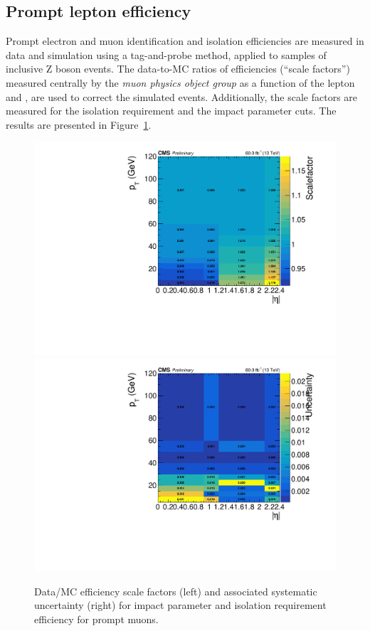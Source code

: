 \subsection{Prompt lepton efficiency} \label{sec:promptleptoneff}
Prompt electron and muon identification and isolation efficiencies
are measured in data and simulation using a tag-and-probe method,
applied to samples of inclusive Z boson events.
The data-to-MC ratios of efficiencies (``scale factors'')
measured centrally by the \emph{muon physics object group} as a function of the lepton \pt and \sigeta, are
used to correct the simulated events. Additionally, the scale factors
are measured for the isolation requirement and the impact
parameter cuts. The results are presented in
Figure~\ref{fig:isoip_muon_prompt}.
\begin{figure}[h]
\centering
  \includegraphics[width=.45\textwidth]{Figures/c6/efficiencies/muons/2018/isoip_prompt_sf_2018.pdf}
  \includegraphics[width=.45\textwidth]{Figures/c6/efficiencies/muons/2018/isoip_prompt_syst_2018.pdf}
  \caption{Data/MC efficiency scale factors (left) and associated
  systematic uncertainty (right) for impact parameter and isolation requirement efficiency
  for prompt muons. \kirill}
  \label{fig:isoip_muon_prompt}
\end{figure}

